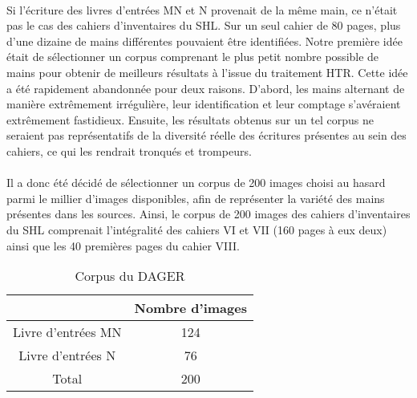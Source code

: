 \documentclass[a4paper,12pt,twoside]{book}
\begin{document}
\paragraph{}
Si l’écriture des livres d’entrées MN et N provenait de la même main, ce n’était pas le cas des cahiers d’inventaires du SHL. Sur un seul cahier de 80 pages, plus d’une dizaine de mains différentes pouvaient être identifiées. Notre première idée était de sélectionner un corpus comprenant le plus petit nombre possible de mains pour obtenir de meilleurs résultats à l’issue du traitement HTR. Cette idée a été rapidement abandonnée pour deux raisons. D’abord, les mains alternant de manière extrêmement irrégulière, leur identification et leur comptage s'avéraient extrêmement fastidieux. Ensuite, les résultats obtenus sur un tel corpus ne seraient pas représentatifs de la diversité réelle des écritures présentes au sein des cahiers, ce qui les rendrait tronqués et trompeurs.

\paragraph{}
Il a donc été décidé de sélectionner un corpus de 200 images choisi au hasard parmi le millier d'images disponibles, afin de représenter la variété des mains présentes dans les sources. Ainsi, le corpus de 200 images des cahiers d’inventaires du SHL comprenait l’intégralité des cahiers VI et VII (160 pages à eux deux) ainsi que les 40 premières pages du cahier VIII.

\begin{table}[h]
	\centering
	\begin{tabular}{|c|c|}
		\hline
		& \textbf{Nombre d'images} \\ %
		\hline
		Livre d'entrées MN & 124 \\ %
		\hline
		Livre d'entrées N & 76 \\ %
		\hline
		Total & 200 \\ %
		\hline
	\end{tabular}
	\caption{Corpus du DAGER} %
	\label{tab:corpus_dager} %
\end{table}
\end{document}
